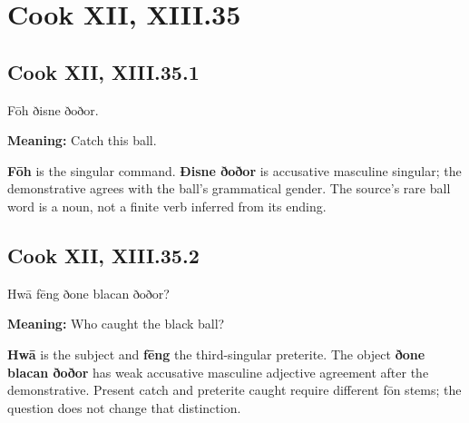 \clearpage
\section*{Cook XII, XIII.35}

\par\begin{minipage}{\linewidth}\raggedright
\subsection*{Cook XII, XIII.35.1}

Fōh ðisne ðoðor.

\textbf{Meaning:} Catch this ball.

\textbf{Fōh} is the singular command. \textbf{Ðisne ðoðor} is accusative masculine singular; the demonstrative agrees with the ball’s grammatical gender. The source’s rare ball word is a noun, not a finite verb inferred from its ending.

\end{minipage}\par\addvspace{4pt}

\par\begin{minipage}{\linewidth}\raggedright
\subsection*{Cook XII, XIII.35.2}

Hwā fēng ðone blacan ðoðor?

\textbf{Meaning:} Who caught the black ball?

\textbf{Hwā} is the subject and \textbf{fēng} the third-singular preterite. The object \textbf{ðone blacan ðoðor} has weak accusative masculine adjective agreement after the demonstrative. Present catch and preterite caught require different fōn stems; the question does not change that distinction.

\end{minipage}\par\addvspace{4pt}

